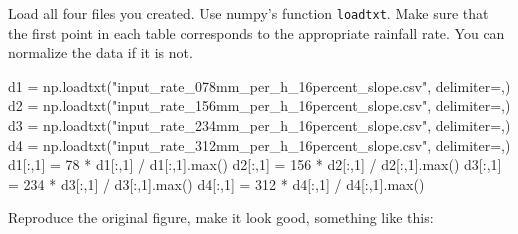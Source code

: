 \documentclass[
  letterpaper,
  DIV=11,
  numbers=noendperiod]{scrreprt}
\newenvironment{Shaded}{\begin{snugshade}}{\end{snugshade}}
\newcommand{\BuiltInTok}[1]{\textcolor[rgb]{0.00,0.23,0.31}{#1}}
\newcommand{\DecValTok}[1]{\textcolor[rgb]{0.68,0.00,0.00}{#1}}
\newcommand{\NormalTok}[1]{\textcolor[rgb]{0.00,0.23,0.31}{#1}}
\newcommand{\OperatorTok}[1]{\textcolor[rgb]{0.37,0.37,0.37}{#1}}
\newcommand{\StringTok}[1]{\textcolor[rgb]{0.13,0.47,0.30}{#1}}
\begin{document}
Load all four files you created. Use numpy's function \texttt{loadtxt}.
Make sure that the first point in each table corresponds to the
appropriate rainfall rate. You can normalize the data if it is not.

\begin{Shaded}
\begin{Highlighting}[]
\NormalTok{d1 }\OperatorTok{=}\NormalTok{ np.loadtxt(}\StringTok{"input\_rate\_078mm\_per\_h\_16percent\_slope.csv"}\NormalTok{, delimiter}\OperatorTok{=}\StringTok{\textquotesingle{},\textquotesingle{}}\NormalTok{)}
\NormalTok{d2 }\OperatorTok{=}\NormalTok{ np.loadtxt(}\StringTok{"input\_rate\_156mm\_per\_h\_16percent\_slope.csv"}\NormalTok{, delimiter}\OperatorTok{=}\StringTok{\textquotesingle{},\textquotesingle{}}\NormalTok{)}
\NormalTok{d3 }\OperatorTok{=}\NormalTok{ np.loadtxt(}\StringTok{"input\_rate\_234mm\_per\_h\_16percent\_slope.csv"}\NormalTok{, delimiter}\OperatorTok{=}\StringTok{\textquotesingle{},\textquotesingle{}}\NormalTok{)}
\NormalTok{d4 }\OperatorTok{=}\NormalTok{ np.loadtxt(}\StringTok{"input\_rate\_312mm\_per\_h\_16percent\_slope.csv"}\NormalTok{, delimiter}\OperatorTok{=}\StringTok{\textquotesingle{},\textquotesingle{}}\NormalTok{)}
\NormalTok{d1[:,}\DecValTok{1}\NormalTok{] }\OperatorTok{=} \DecValTok{78}  \OperatorTok{*}\NormalTok{ d1[:,}\DecValTok{1}\NormalTok{] }\OperatorTok{/}\NormalTok{ d1[:,}\DecValTok{1}\NormalTok{].}\BuiltInTok{max}\NormalTok{()}
\NormalTok{d2[:,}\DecValTok{1}\NormalTok{] }\OperatorTok{=} \DecValTok{156} \OperatorTok{*}\NormalTok{ d2[:,}\DecValTok{1}\NormalTok{] }\OperatorTok{/}\NormalTok{ d2[:,}\DecValTok{1}\NormalTok{].}\BuiltInTok{max}\NormalTok{()}
\NormalTok{d3[:,}\DecValTok{1}\NormalTok{] }\OperatorTok{=} \DecValTok{234} \OperatorTok{*}\NormalTok{ d3[:,}\DecValTok{1}\NormalTok{] }\OperatorTok{/}\NormalTok{ d3[:,}\DecValTok{1}\NormalTok{].}\BuiltInTok{max}\NormalTok{()}
\NormalTok{d4[:,}\DecValTok{1}\NormalTok{] }\OperatorTok{=} \DecValTok{312} \OperatorTok{*}\NormalTok{ d4[:,}\DecValTok{1}\NormalTok{] }\OperatorTok{/}\NormalTok{ d4[:,}\DecValTok{1}\NormalTok{].}\BuiltInTok{max}\NormalTok{()}
\end{Highlighting}
\end{Shaded}

Reproduce the original figure, make it look good, something like this:
\end{document}
